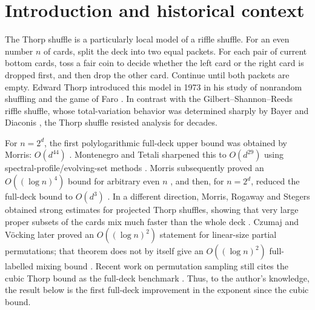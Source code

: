 \documentclass[11pt]{article}
\numberwithin{equation}{section}
\theoremstyle{definition}\newtheorem{definition}[theorem]{Definition}
\theoremstyle{remark}\newtheorem{remark}[theorem]{Remark}
\begin{document}
\tableofcontents

\section{Introduction and historical context}\label{sec:introduction}

The Thorp shuffle is a particularly local model of a riffle shuffle.  For an
even number $n$ of cards, split the deck into two equal packets.  For each pair
of current bottom cards, toss a fair coin to decide whether the left card or the
right card is dropped first, and then drop the other card.  Continue until both
packets are empty.  Edward Thorp introduced this model in 1973 in his study of
nonrandom shuffling and the game of Faro \cite{Thorp1973}.  In contrast with
the Gilbert--Shannon--Reeds riffle shuffle, whose total-variation behavior was
determined sharply by Bayer and Diaconis \cite{BayerDiaconis1992}, the Thorp
shuffle resisted analysis for decades.

For $n=2^d$, the first polylogarithmic full-deck upper bound was obtained by
Morris: $O(d^{44})$ \cite{Morris2008}.  Montenegro and Tetali sharpened this to
$O(d^{29})$ using spectral-profile/evolving-set methods
\cite{MontenegroTetali2006}.  Morris subsequently proved an $O((\log n)^4)$
bound for arbitrary even $n$ \cite{Morris2009AOP}, and then, for $n=2^d$,
reduced the full-deck bound to $O(d^3)$ \cite{Morris2013}.  In a different
direction, Morris, Rogaway and Stegers obtained strong estimates for projected
Thorp shuffles, showing that very large proper subsets of the cards mix much
faster than the whole deck \cite{MorrisRogawayStegers2009}.  Czumaj and V\"ocking
later proved an $O((\log n)^2)$ statement for linear-size partial permutations;
that theorem does not by itself give an $O((\log n)^2)$ full-labelled mixing
bound \cite{CzumajVoecking2014}.  Recent work on permutation sampling still
cites the cubic Thorp bound as the full-deck benchmark
\cite{AlekseevEtAl2026}.  Thus, to the author's knowledge, the result below is
the first full-deck improvement in the exponent since the cubic bound.
\end{document}
